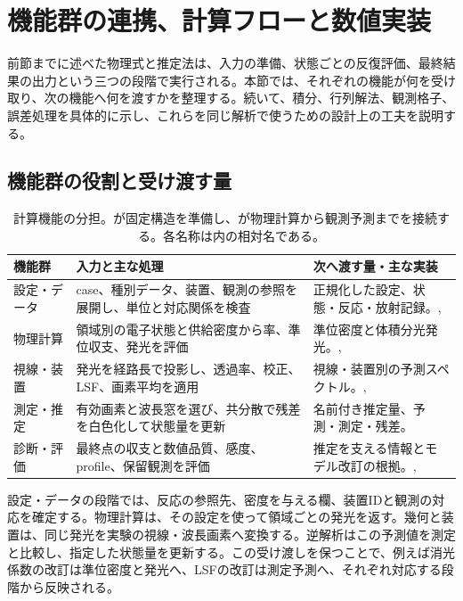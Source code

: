 \section{機能群の連携、計算フローと数値実装}
\label{sec:implementation}
前節までに述べた物理式と推定法は、入力の準備、状態ごとの反復評価、最終結果の出力という三つの段階で実行される。本節では、それぞれの機能が何を受け取り、次の機能へ何を渡すかを整理する。続いて、積分、行列解法、観測格子、誤差処理を具体的に示し、これらを同じ解析で使うための設計上の工夫を説明する。

\subsection{機能群の役割と受け渡す量}
\begin{table}[htbp]
\centering\small
\begin{tabularx}{\linewidth}{p{24mm}YY}
\toprule
機能群 & 入力と主な処理 & 次へ渡す量・主な実装 \\
\midrule
設定・データ & case、種別データ、装置、観測の参照を展開し、単位と対応関係を検査 & 正規化した設定、状態・反応・放射記録。,  \\
物理計算 & 領域別の電子状態と供給密度から率、準位収支、発光を評価 & 準位密度と体積分光発光。,  \\
視線・装置 & 発光を経路長で投影し、透過率、校正、LSF、画素平均を適用 & 視線・装置別の予測スペクトル。,  \\
測定・推定 & 有効画素と波長窓を選び、共分散で残差を白色化して状態量を更新 & 名前付き推定量、予測・測定・残差。 \\
診断・評価 & 最終点の収支と数値品質、感度、profile、保留観測を評価 & 推定を支える情報とモデル改訂の根拠。,  \\
\bottomrule
\end{tabularx}
\caption{計算機能の分担。が固定構造を準備し、が物理計算から観測予測までを接続する。各名称は内の相対名である。}
\label{tab:function-groups}
\end{table}

設定・データの段階では、反応の参照先、密度を与える欄、装置IDと観測の対応を確定する。物理計算は、その設定を使って領域ごとの発光を返す。幾何と装置は、同じ発光を実験の視線・波長画素へ変換する。逆解析はこの予測値を測定と比較し、指定した状態量を更新する。この受け渡しを保つことで、例えば消光係数の改訂は準位密度と発光へ、LSFの改訂は測定予測へ、それぞれ対応する段階から反映される。


